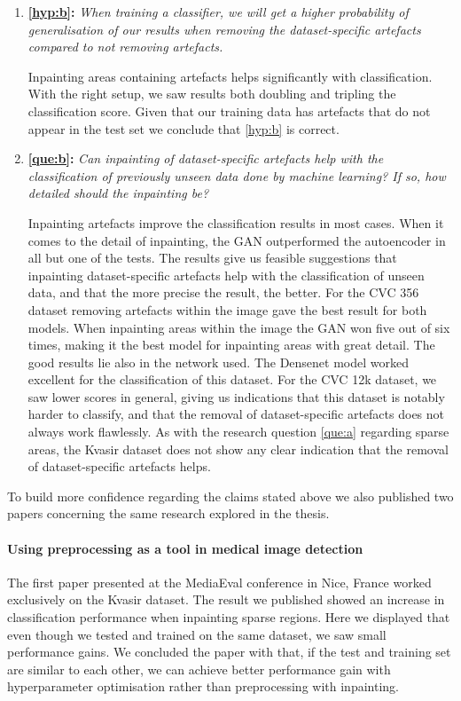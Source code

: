 \begin{enumerate}
\item \textbf{\ref{hyp:b}:} \textit{When training a classifier, we will get a higher probability of generalisation of our results when removing the dataset-specific artefacts compared to not removing artefacts.}
    
Inpainting areas containing artefacts helps significantly with classification. With the right setup, we saw results both doubling and tripling the classification score. Given that our training data has artefacts that do not appear in the test set we conclude that \ref{hyp:b} is correct.


\item \textbf{\ref{que:b}:} \textit{ Can inpainting of dataset-specific artefacts help with the classification of previously unseen data done by machine learning? If so, how detailed should the inpainting be?}
    
    
Inpainting artefacts improve the classification results in most cases. When it comes to the detail of inpainting, the GAN outperformed the autoencoder in all but one of the tests. The results give us feasible suggestions that inpainting dataset-specific artefacts help with the classification of unseen data, and that the more precise the result, the better.
For the CVC 356 dataset removing artefacts within the image gave the best result for both models. When inpainting areas within the image the GAN won five out of six times, making it the best model for inpainting areas with great detail. The good results lie also in the network used. The Densenet model worked excellent for the classification of this dataset.
For the CVC 12k dataset, we saw lower scores in general, giving us indications that this dataset is notably harder to classify, and that the removal of dataset-specific artefacts does not always work flawlessly. 
As with the research question \ref{que:a} regarding sparse areas, the Kvasir dataset does not show any clear indication that the removal of dataset-specific artefacts helps.

\end{enumerate}


\noindent
To build more confidence regarding the claims stated above we also published two papers concerning the same research explored in the thesis.

\paragraph{Using preprocessing as a tool in medical image detection~\cite{Mathias2018MediaevalPaper}}
The first paper presented at the MediaEval conference in Nice, France worked exclusively on the Kvasir dataset. The result we published showed an increase in classification performance when inpainting sparse regions. 
Here we displayed that even though we tested and trained on the same dataset, we saw small performance gains. We concluded the paper with that, if the test and training set are similar to each other, we can achieve better performance gain with hyperparameter optimisation rather than preprocessing with inpainting. 


